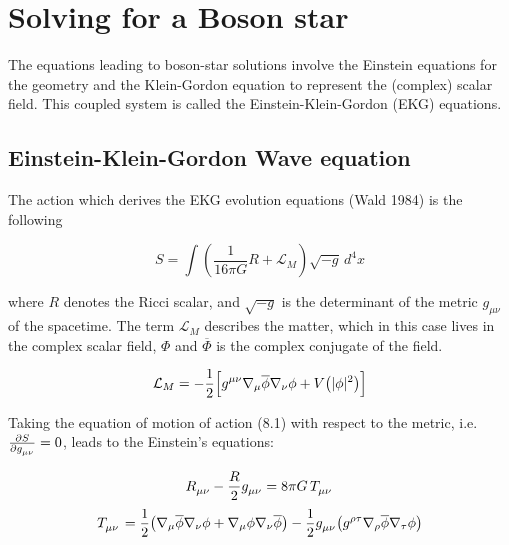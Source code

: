 \documentclass[12pt]{article}
\numberwithin{equation}{section}
\numberwithin{theorem}{subsection}
\begin{document}
\section{Solving for a Boson star}

The equations leading to boson-star solutions involve the Einstein equations for the geometry and the Klein-Gordon equation to represent the (complex) scalar field. This coupled system is called the Einstein-Klein-Gordon (EKG) equations.

\subsection{Einstein-Klein-Gordon Wave equation}

The action which derives the EKG evolution equations (Wald 1984) is the following

\begin{equation}

    S = \int (\frac{1}{16 \pi G}R+\mathcal{L}_{M})\sqrt{-g}\, d^4x

\end{equation}

where $R$ denotes the Ricci scalar, and $\sqrt{-g}$ is the determinant of the metric $g_{\mu\nu}$ of the spacetime. The term $\mathcal{L}_{M}$ describes the matter, which in this case lives in the complex scalar field, $\Phi$ and $\overline{\Phi}$ is the complex conjugate of the field.

\begin{equation*}

    \mathcal{L}_{M} = -\frac{1}{2}\Big[\tensor{g}{^\mu^\nu} \nabla_{\mu}\overline{\phi} \nabla_{\nu}\phi+ V\big(|\phi|^{2} \big) \Big]

\end{equation*}

Taking the equation of motion of action (8.1) with respect to the metric, i.e. $\frac{\partial S}{\partial \tensor{g}{_\mu_\nu}}=0$, leads to the Einstein's equations:

\begin{equation}

    \tensor{R}{_\mu_\nu}-\frac{R}{2}\tensor{g}{_\mu_\nu} = 8\pi G \, \tensor{T}{_\mu_\nu}

\end{equation} \begin{equation} 

    \tensor{T}{_\mu_\nu}=\frac{1}{2}\big(\nabla_{\mu}\overline{\phi} \nabla_{\nu}\phi+\nabla_{\mu}\phi \nabla_{\nu}\overline{\phi}\big)-\frac{1}{2}\tensor{g}{_\mu_\nu}\big(\tensor{g}{^\rho^\tau}\nabla_{\rho}\overline{\phi}\nabla_{\tau}\phi\big)\end{equation}
\end{document}
